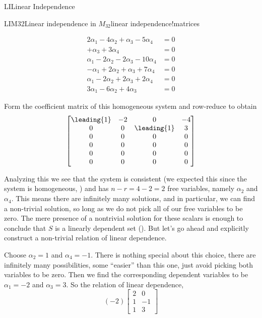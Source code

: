\begin{subsect}{LI}{Linear Independence}
\begin{example}{LIM32}{Linear independence in $M_{32}$}{linear independence!matrices}
\begin{para}
%
\begin{align*}
2\alpha_1-4\alpha_2+\alpha_3-5\alpha_4&=0\\
                             +\alpha_3+3\alpha_4&=0\\
\alpha_1-2\alpha_2-2\alpha_3-10\alpha_4&=0\\
-\alpha_1+2\alpha_2+\alpha_3+7\alpha_4&=0\\
\alpha_1-2\alpha_2+2\alpha_3+2\alpha_4&=0\\
3\alpha_1-6\alpha_2+4\alpha_3         &=0
\end{align*}
\end{para}
%
\begin{para}Form the coefficient matrix of this homogeneous system and row-reduce to obtain
%
\begin{equation*}
\begin{bmatrix}
\leading{1} & -2 & 0 & -4\\
0 & 0 & \leading{1} & 3\\
0 & 0 & 0 & 0\\
0 & 0 & 0 & 0\\
0 & 0 & 0 & 0\\
0 & 0 & 0 & 0
\end{bmatrix}
\end{equation*}
\end{para}
%
\begin{para}Analyzing this we see that the system is consistent (we expected this since the system is homogeneous, ) and has $n-r=4-2=2$ free variables, namely $\alpha_2$ and $\alpha_4$.  This means there are infinitely many solutions, and in particular, we can find a non-trivial solution, so long as we do not pick all of our free variables to be zero.  The mere presence of a nontrivial solution for these scalars is enough to conclude that  $S$ is a linearly dependent set ().  But let's go ahead and explicitly construct a non-trivial relation of linear dependence.\end{para}
%
\begin{para}Choose $\alpha_2=1$ and $\alpha_4=-1$.  There is nothing special about this choice, there are infinitely many possibilities, some ``easier'' than this one, just avoid picking both variables to be zero.  Then we find the corresponding dependent variables to be $\alpha_1=-2$ and $\alpha_3=3$.  So the relation of linear dependence,
%
\begin{equation*}
(-2)\begin{bmatrix}
2 & 0\\ 1 & -1\\ 1 & 3

\end{bmatrix}
\end{equation*}
\end{para}
\end{example}
\end{subsect}
